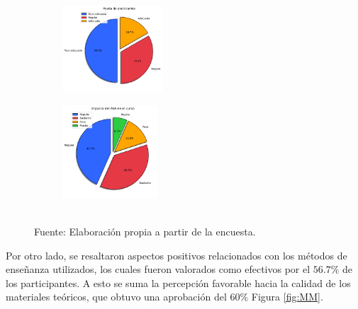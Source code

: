 \documentclass[letter,oneside,12pt,spanish]{report}
\begin{document}
\begin{figure}[h]
	\centering
    \begin{subfigure}
        \centering
        \includegraphics[width=0.41\textwidth]{Figs/ayuda_practicantes.pdf}
    \end{subfigure}
	\hfill
    \begin{subfigure}
        \centering
        \includegraphics[width=0.39\textwidth]{Figs/impacto_aprendizaje.pdf}
    \end{subfigure}
	\label{fig:Ayuda_Impacto}
	\\ Fuente: Elaboración propia a partir de la encuesta.
\end{figure}

Por otro lado, se resaltaron aspectos positivos relacionados con los métodos de enseñanza utilizados, los cuales fueron valorados como efectivos por el $56.7\%$ de los participantes. A esto se suma la percepción favorable hacia la calidad de los materiales teóricos, que obtuvo una aprobación del $60\%$ Figura \ref{fig:MM}. 
\end{document}
